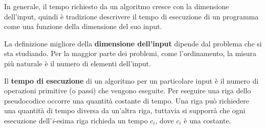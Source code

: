 \documentclass[10pt, a4paper]{report}
\begin{document}
In generale, il tempo richiesto da un algoritmo cresce con la dimensione dell'input, quindi è tradizione descrivere il tempo di esecuzione di un programma come una funzione della dimensione del suo input.

La definizione migliore della \textbf{dimensione dell'input} dipende dal problema che si sta studiando. Per la maggior parte dei problemi, come l'ordinamento, la misura più naturale è il numero di elementi dell'input.

Il \textbf{tempo di esecuzione} di un algoritmo per un particolare input è il numero di operazioni primitive (o passi) che vengono eseguite. Per eseguire una riga dello pseudocodice occorre una quantità costante di tempo. Una riga può richiedere una quantità di tempo diversa da un'altra riga, tuttavia si supporrà che ogni esecuzione dell'\textit{i}-esima riga richieda un tempo $\textit{c}_i$, dove $\textit{c}_i$ è una costante.
\end{document}
